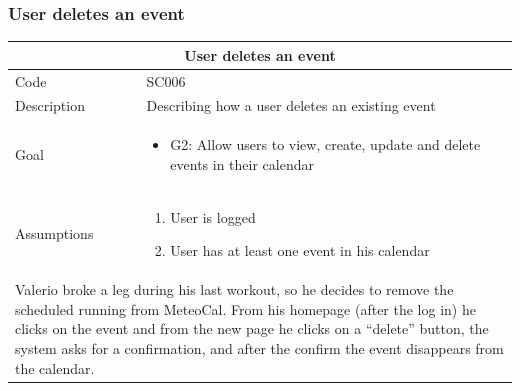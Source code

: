 \documentclass[10pt,a4paper,titlepage]{article}
\begin{document}
\subsubsection{User deletes an event}
\begin{tabular}{| p{3cm} | p{10cm} |}
\hline \multicolumn{2}{|c|}{\textbf{User deletes an event}} \\ 
\hline Code & SC006 \\ 
\hline Description & Describing how a user deletes an existing event \\
\hline Goal & \begin{itemize}\item G2: Allow users to view, create, update and delete events in their calendar\end{itemize}\\
\hline Assumptions & \begin{enumerate}
\item User is logged
\item User has at least one event in his calendar
\end{enumerate} \\
\hline \multicolumn{2}{|p{13cm}|}{Valerio broke a leg during his last workout, so he decides to remove the scheduled running from MeteoCal. From his homepage (after the log in) he clicks on the event and from the new page he clicks on a “delete” button, the system asks for a confirmation, and after the confirm the event disappears from the calendar.}\\
\hline
\end{tabular}
\end{document}
